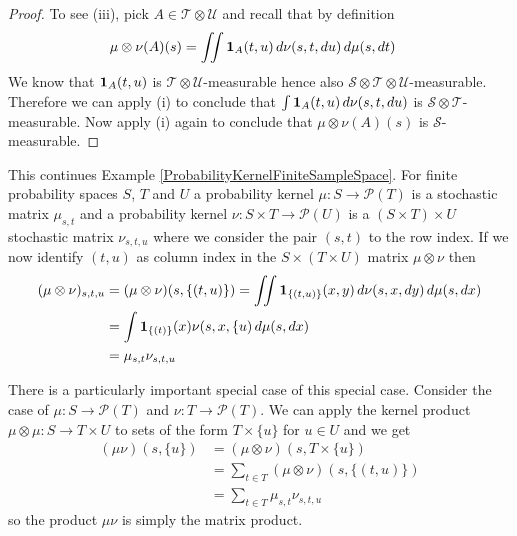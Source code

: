 \begin{proof}
To see (iii), pick $A \in \mathcal{T} \otimes \mathcal{U}$ and recall
that by definition
\begin{align*}
\mu \otimes \nu (A) (s) &= \iint \textbf{1}_{A}(t,u) \,
d\nu(s,t,du) \, d\mu(s, dt)
\end{align*}
We know that $\textbf{1}_{A}(t,u)$ is $\mathcal{T} \otimes
\mathcal{U}$-measurable hence also $\mathcal{S} \otimes \mathcal{T} \otimes
\mathcal{U}$-measurable.  Therefore we can apply (i) to conclude that $\int \textbf{1}_{A}(t,u) \,
d\nu(s,t,du)$ is $\mathcal{S} \otimes \mathcal{T}$-measurable.  Now
apply (i) again to conclude that $\mu \otimes \nu (A) (s)$ is $\mathcal{S}$-measurable.
\end{proof}

\begin{examp}\label{ProbabilityKernelProductFiniteSampleSpace}
This continues Example \ref{ProbabilityKernelFiniteSampleSpace}.  For finite probability spaces $S$, $T$ and $U$ a probability kernel
$\mu : S  \to \mathcal{P}(T)$ is a stochastic matrix $\mu_{s,t}$ and a
probability kernel $\nu : S \times T \to \mathcal{P}(U)$ is a $(S
\times T) \times U$
stochastic matrix $\nu_{s,t, u}$ where we consider the pair $(s,t)$ to
the row index.  If we now identify $(t,u)$ as column index in the 
$S \times (T \times U)$ matrix $\mu \otimes \nu$ then 
\begin{align*}
(\mu \otimes
\nu)_{s,t,u} 
&= (\mu \otimes\nu)(s, \lbrace (t,u) \rbrace) = \iint
\textbf{1}_{\lbrace (t,u) \rbrace} (x,y) \, d\nu(s,x,dy) \,
d\mu(s, dx) \\
&= \int \textbf{1}_{\lbrace (t) \rbrace} (x) \nu(s,x, \lbrace{u}) \,
d\mu(s, dx) \\
&=\mu_{s,t} \nu_{s,t,u} 
\end{align*}

There is a particularly important special case of this special case.
Consider the case of $\mu : S \to \mathcal{P}(T)$  and $\nu : T \to
\mathcal{P}(T)$.  We can apply the kernel product $\mu \otimes \mu : S
\to T \times U$ to sets of the form $T \times \lbrace u \rbrace$ for
$u \in U$ and we get
\begin{align*}
(\mu \nu)(s, \lbrace u \rbrace) &= (\mu \otimes \nu)(s, T \times
\lbrace u \rbrace) \\
&=\sum_{t \in T}  (\mu \otimes \nu)(s,  \lbrace (t,u) \rbrace) \\
&= \sum_{t \in T} \mu_{s,t} \nu_{s,t,u} 
\end{align*}
so the product $\mu \nu$ is simply the matrix product.
\end{examp}

